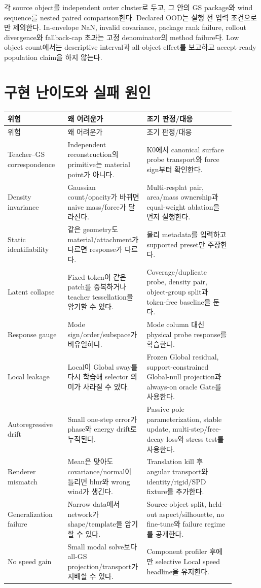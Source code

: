 \documentclass[11pt]{article}
\begin{document}
각 source object를 independent outer cluster로 두고, 그 안의 GS package와 wind sequence를 nested paired comparison한다.
Declared OOD는 실행 전 입력 조건으로만 제외한다. In-envelope NaN, invalid covariance, package rank failure,
rollout divergence와 fallback-cap 초과는 고정 denominator의 method failure다.
Low object count에서는 descriptive interval과 all-object effect를 보고하고 accept-ready population claim을 하지 않는다.

\section{구현 난이도와 실패 원인}

\begin{longtable}{L{0.23\linewidth}L{0.31\linewidth}L{0.35\linewidth}}
\toprule
위험 & 왜 어려운가 & 조기 판정/대응\\
\midrule
\endfirsthead
\toprule
위험 & 왜 어려운가 & 조기 판정/대응\\
\midrule
\endhead
Teacher--GS correspondence & Independent reconstruction의 primitive는 material point가 아니다. & K0에서 canonical surface probe transport와 force sign부터 확인한다.\\
Density invariance & Gaussian count/opacity가 바뀌면 naive mass/force가 달라진다. & Multi-resplat pair, area/mass ownership과 equal-weight ablation을 먼저 실행한다.\\
Static identifiability & 같은 geometry도 material/attachment가 다르면 response가 다르다. & 물리 metadata를 입력하고 supported preset만 주장한다.\\
Latent collapse & Fixed token이 같은 patch를 중복하거나 teacher tessellation을 암기할 수 있다. & Coverage/duplicate probe, density pair, object-group split과 token-free baseline을 둔다.\\
Response gauge & Mode sign/order/subspace가 비유일하다. & Mode column 대신 physical probe response를 학습한다.\\
Local leakage & Local이 Global sway를 다시 학습해 selector 의미가 사라질 수 있다. & Frozen Global residual, support-constrained Global-null projection과 always-on oracle Gate를 사용한다.\\
Autoregressive drift & Small one-step error가 phase와 energy drift로 누적된다. & Passive pole parameterization, stable update, multi-step/free-decay loss와 stress test를 사용한다.\\
Renderer mismatch & Mean은 맞아도 covariance/normal이 틀리면 blur와 wrong wind가 생긴다. & Translation kill 후 angular transport와 identity/rigid/SPD fixture를 추가한다.\\
Generalization failure & Narrow data에서 network가 shape/template을 암기할 수 있다. & Source-object split, held-out aspect/silhouette, no fine-tune와 failure regime를 공개한다.\\
No speed gain & Small modal solve보다 all-GS projection/transport가 지배할 수 있다. & Component profiler 후에만 selective Local speed headline을 유지한다.\\
\bottomrule
\end{longtable}
\end{document}
